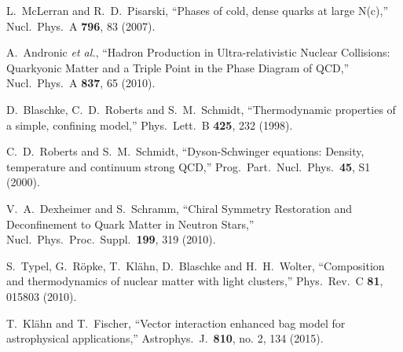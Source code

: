 \documentclass{webofc}
\begin{document}
\begin{thebibliography}{}
  L.~McLerran and R.~D.~Pisarski,
  ``Phases of cold, dense quarks at large N(c),''
  Nucl.\ Phys.\ A {\bf 796}, 83 (2007).

  A.~Andronic {\it et al.},
  ``Hadron Production in Ultra-relativistic Nuclear Collisions: Quarkyonic Matter and a Triple Point in the Phase Diagram of QCD,''
  Nucl.\ Phys.\ A {\bf 837}, 65 (2010).

  D.~Blaschke, C.~D.~Roberts and S.~M.~Schmidt,
  ``Thermodynamic properties of a simple, confining model,''
  Phys.\ Lett.\ B {\bf 425}, 232 (1998).

  C.~D.~Roberts and S.~M.~Schmidt,
  ``Dyson-Schwinger equations: Density, temperature and continuum strong QCD,''
  Prog.\ Part.\ Nucl.\ Phys.\  {\bf 45}, S1 (2000).

  V.~A.~Dexheimer and S.~Schramm,
  ``Chiral Symmetry Restoration and Deconfinement to Quark Matter in Neutron Stars,''
  Nucl.\ Phys.\ Proc.\ Suppl.\  {\bf 199}, 319 (2010).

  S.~Typel, G.~R\"opke, T.~Kl\"ahn, D.~Blaschke and H.~H.~Wolter,
  ``Composition and thermodynamics of nuclear matter with light clusters,''
  Phys.\ Rev.\ C {\bf 81}, 015803 (2010).
  
  T.~Kl\"ahn and T.~Fischer,
  ``Vector interaction enhanced bag model for astrophysical applications,''
  Astrophys.\ J.\  {\bf 810}, no. 2, 134 (2015).
  

\end{thebibliography}
\end{document}
